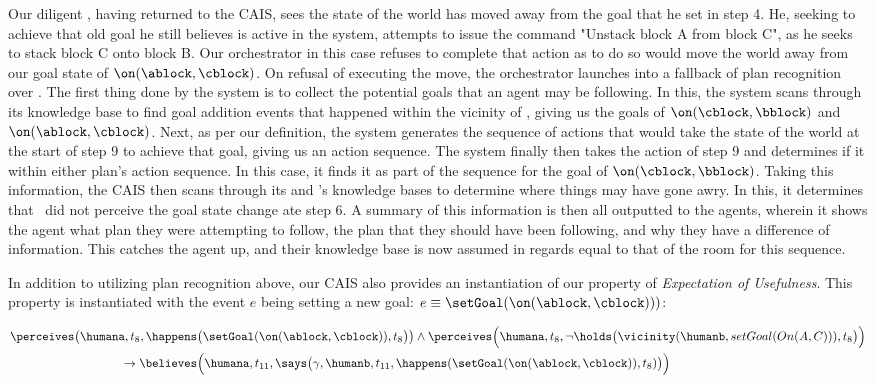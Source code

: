 Our diligent \humanb, having returned to the CAIS, sees the state of the world
has moved away from the goal that he set in step 4. He, seeking to achieve that
old goal he still believes is active in the system, attempts to issue the command
"Unstack block A from block C", as he seeks to stack block C onto block B. Our
orchestrator in this case refuses to complete that action as to do so would
move the world away from our goal state of $\on(\ablock, \cblock)$. On refusal
of executing the move, the orchestrator launches into a fallback of plan recognition
over \humanb. The first thing done by the system is to collect the potential goals
that an agent may be following. In this, the system scans through its knowledge base
to find goal addition events that happened within the vicinity of \humanb, giving
us the goals of $\on(\cblock, \bblock)$ and $\on(\ablock, \cblock)$. Next, as per
our definition, the system generates the sequence of actions that would take the
state of the world at the start of step 9 to achieve that goal, giving us an
action sequence. The system finally then takes the action of step 9 and determines
if it within either plan's action sequence. In this case, it finds it as part of
the sequence for the goal of $\on(\cblock, \bblock)$. Taking this information, the
CAIS then scans through its and \humanb's knowledge bases to determine where things
may have gone awry. In this, it determines that \humanb\ did not perceive the goal
state change ate step 6. A summary of this information is then all outputted to the
agents, wherein it shows the agent what plan they were attempting to follow, the plan
that they should have been following, and why they have a difference of information.
This catches the agent up, and their knowledge base is now assumed in regards equal
to that of the room for this sequence.

In addition to utilizing plan recognition above, our CAIS also provides an instantiation
of our property of \textit{Expectation of Usefulness}. This property is
instantiated with the event $e$ being setting a new goal:
$e \equiv \setGoal(\on(\ablock, \cblock)))$:

\begin{footnotesize}
\begin{equation*}
\begin{aligned}
&\perceives\big(\humana, t_8, \happens\big(\setGoal(\on(\ablock,\cblock)), t_{8}\big)\big) \land \perceives\Big(\humana, t_8, \lnot \holds\big(\vicinity(\humanb, setGoal (On(A,C))), t_8\big)\Big) \\
& \hspace{90pt} \rightarrow \believes\Big(\humana, t_{11}, \says\big(\gamma, \humanb, t_{11},
\happens(\setGoal(\on(\ablock,\cblock)), t_8)\big)\Big)
\end{aligned}
\end{equation*}
\end{footnotesize}